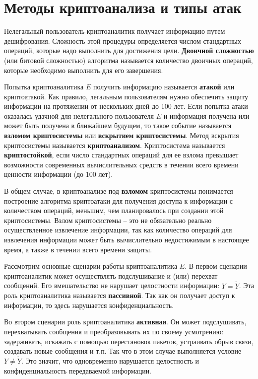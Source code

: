 \section{Методы криптоанализа и типы атак}

Нелегальный пользователь-криптоаналитик получает информацию путем дешифрования. Сложность этой процедуры определяется числом стандартных операций, которые надо выполнить для достижения цели. \textbf{Двоичной сложностью} (или битовой сложностью) алгоритма называется количество двоичных операций, которые необходимо выполнить для его завершения.

Попытка криптоаналитика $E$ получить информацию называется \textbf{атакой} или криптоатакой. Как правило, легальным пользователям нужно обеспечить защиту информации на протяжении от нескольких дней до 100 лет. Если попытка атаки оказалась удачной для нелегального пользователя $E$ и информация получена или может быть получена в ближайшем будущем, то такое событие называется  \textbf{взломом криптосистемы} или \textbf{вскрытием криптосистемы}. Метод вскрытия криптосистемы называется \textbf{криптоанализом}. Криптосистема называется \textbf{криптостойкой}, если число стандартных операций для ее взлома превышает возможности современных вычислительных средств в течении всего времени ценности информации (до 100 лет).

В общем случае, в криптоанализе под \textbf{взломом} криптосистемы понимается построение алгоритма криптоатаки для получения доступа к информации с количеством операций, меньшим, чем планировалось при создании этой криптосистемы. Взлом криптосистемы -- это не обязательно реально осуществленное извлечение информации, так как количество операций для извлечения информации может быть вычислительно недостижимым в настоящее время, а также в течении всего времени защиты.

Рассмотрим основные сценарии работы криптоаналитика $E$. В первом сценарии криптоаналитик может осуществлять подслушивание и (или) перехват сообщений. Его вмешательство не нарушает целостности информации: $Y=\widetilde{Y}$. Эта роль криптоаналитика называется \textbf{пассивной}. Так как он получает доступ к информации, то здесь нарушается конфиденциальность.

Во втором сценарии роль криптоаналитика \textbf{активная}. Он может подслушивать, перехватывать сообщения и преобразовывать их по своему усмотрению: задерживать, искажать с помощью перестановок пакетов, устраивать обрыв связи, создавать новые сообщения и т.п. Так что в этом случае выполняется условие $Y \neq \widetilde{Y}$. Это значит, что одновременно нарушается целостность и конфиденциальность передаваемой информации.

